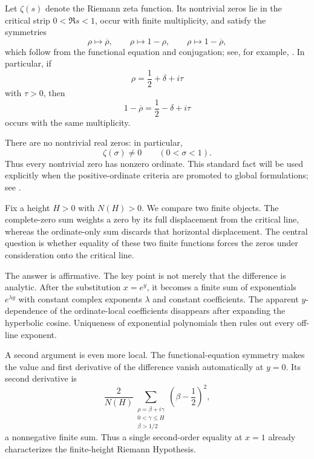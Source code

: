 \documentclass[11pt]{amsart}
\numberwithin{equation}{section}
\theoremstyle{plain}
\theoremstyle{definition}
\theoremstyle{remark}
\begin{document}
Let $\zeta(s)$ denote the Riemann zeta function.  Its nontrivial zeros lie in the critical strip $0<\Re s<1$, occur with finite multiplicity, and satisfy the symmetries
\begin{equation}
\rho\longmapsto \overline{\rho},
\qquad
\rho\longmapsto 1-\rho,
\qquad
\rho\longmapsto 1-\overline{\rho},
\label{eq:zero_symmetries}
\end{equation}
which follow from the functional equation and conjugation; see, for example, \cite{Titchmarsh1986,Edwards1974}.  In particular, if
\begin{equation}
\rho=\frac12+\delta+i\tau
\label{eq:zero_delta_parameterization}
\end{equation}
with $\tau>0$, then
\begin{equation}
1-\overline{\rho}=\frac12-\delta+i\tau
\label{eq:paired_zero_same_ordinate}
\end{equation}
occurs with the same multiplicity.

There are no nontrivial real zeros: in particular,
\begin{equation}
\zeta(\sigma)\neq0
\qquad(0<\sigma<1).
\label{eq:no_nontrivial_real_zeros}
\end{equation}
Thus every nontrivial zero has nonzero ordinate.  This standard fact will be used explicitly when the positive-ordinate criteria are promoted to global formulations; see \cite{Titchmarsh1986,Edwards1974}.

Fix a height $H>0$ with $N(H)>0$.  We compare two finite objects.  The complete-zero sum weights a zero by its full displacement from the critical line, whereas the ordinate-only sum discards that horizontal displacement.  The central question is whether equality of these two finite functions forces the zeros under consideration onto the critical line.

The answer is affirmative.  The key point is not merely that the difference is analytic.  After the substitution $x=e^y$, it becomes a finite sum of exponentials $e^{\lambda y}$ with constant complex exponents $\lambda$ and constant coefficients.  The apparent $y$-dependence of the ordinate-local coefficients disappears after expanding the hyperbolic cosine.  Uniqueness of exponential polynomials then rules out every off-line exponent.

A second argument is even more local.  The functional-equation symmetry makes the value and first derivative of the difference vanish automatically at $y=0$.  Its second derivative is
\begin{equation}
\frac{2}{N(H)}
\sum_{\substack{\rho=\beta+i\gamma\\0<\gamma\leq H\\\beta>1/2}}
\left(\beta-\frac12\right)^2,
\label{eq:introduction_second_moment}
\end{equation}
a nonnegative finite sum.  Thus a single second-order equality at $x=1$ already characterizes the finite-height Riemann Hypothesis.
\end{document}
